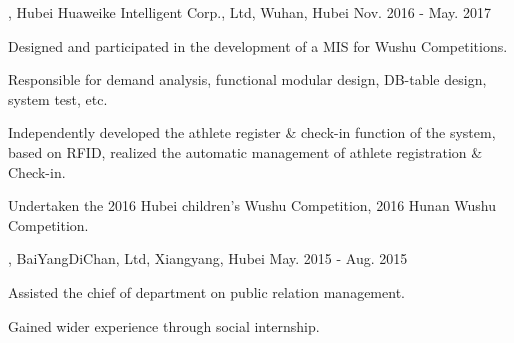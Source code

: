
\begin{cventries}
\vspace{-1.5mm}

\cvexperience
{, Hubei Huaweike Intelligent Corp., Ltd, Wuhan, Hubei}
{Nov. 2016 - May. 2017}
{
    \begin{cvitems}
    \item {Designed and participated in the development of a MIS for Wushu Competitions.}
    \item {Responsible for demand analysis, functional modular design, DB-table design, system test, etc.}
    \item {Independently developed the athlete register \& check-in function of the system, based on RFID, realized the automatic management of athlete registration \& Check-in.}
    \item {Undertaken the 2016 Hubei children’s Wushu Competition, 2016 Hunan Wushu Competition.}
    \end{cvitems}
}

\cvexperience
{, BaiYangDiChan, Ltd, Xiangyang, Hubei}
{May. 2015 - Aug. 2015}
{
    \begin{cvitems}
    \item {Assisted the chief of department on public relation management.}
    \item {Gained wider experience through social internship.}
    \end{cvitems}
}

\end{cventries}